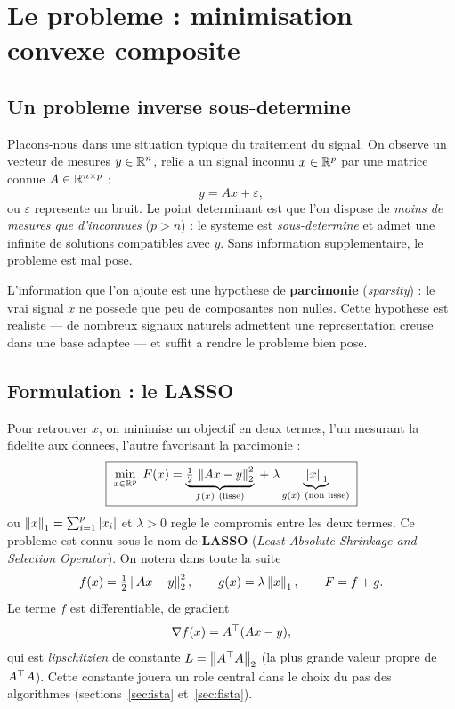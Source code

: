 \section{Le probleme : minimisation convexe composite}
\label{sec:probleme}

\subsection{Un probleme inverse sous-determine}

Placons-nous dans une situation typique du traitement du signal. On observe un
vecteur de mesures $y \in \mathbb{R}^{n}$, relie a un signal inconnu $x \in \mathbb{R}^{p}$ par
une matrice connue $A \in \mathbb{R}^{n \times p}$ :
\[
  y = A x + \varepsilon,
\]
ou $\varepsilon$ represente un bruit. Le point determinant est que l'on dispose
de \emph{moins de mesures que d'inconnues} ($p > n$) : le systeme est
\emph{sous-determine} et admet une infinite de solutions compatibles avec $y$.
Sans information supplementaire, le probleme est mal pose.

L'information que l'on ajoute est une hypothese de \textbf{parcimonie}
(\emph{sparsity}) : le vrai signal $x$ ne possede que peu de composantes non
nulles. Cette hypothese est realiste --- de nombreux signaux naturels admettent
une representation creuse dans une base adaptee --- et suffit a rendre le
probleme bien pose.

\subsection{Formulation : le LASSO}

Pour retrouver $x$, on minimise un objectif en deux termes, l'un mesurant la
fidelite aux donnees, l'autre favorisant la parcimonie :
\begin{equation}
\label{eq:lasso}
  \boxed{\;
  \min_{x \in \R^{p}} \; F(x)
  = \underbrace{\tfrac{1}{2}\,\norm{A x - y}_2^{2}}_{f(x)\ \text{(lisse)}}
  \;+\; \lambda \underbrace{\norm{x}_1}_{g(x)\ \text{(non lisse)}}
  \;}
\end{equation}
ou $\left\lVert x \right\rVert_1 = \sum_{i=1}^{p} |x_i|$ et $\lambda > 0$ regle le compromis entre
les deux termes. Ce probleme est connu sous le nom de \textbf{LASSO}
(\emph{Least Absolute Shrinkage and Selection Operator}). On notera dans toute
la suite
\[
  f(x) = \tfrac{1}{2}\left\lVert A x - y \right\rVert_2^{2},
  \qquad
  g(x) = \lambda \left\lVert x \right\rVert_1,
  \qquad
  F = f + g .
\]
Le terme $f$ est differentiable, de gradient
\begin{equation}
\label{eq:gradf}
  \nabla f(x) = A^{\top} (A x - y),
\end{equation}
qui est \emph{lipschitzien} de constante $L = \left\lVert A^{\top} A \right\rVert_2$ (la plus grande
valeur propre de $A^{\top} A$). Cette constante jouera un role central dans le choix
du pas des algorithmes (sections~\ref{sec:ista} et~\ref{sec:fista}).

